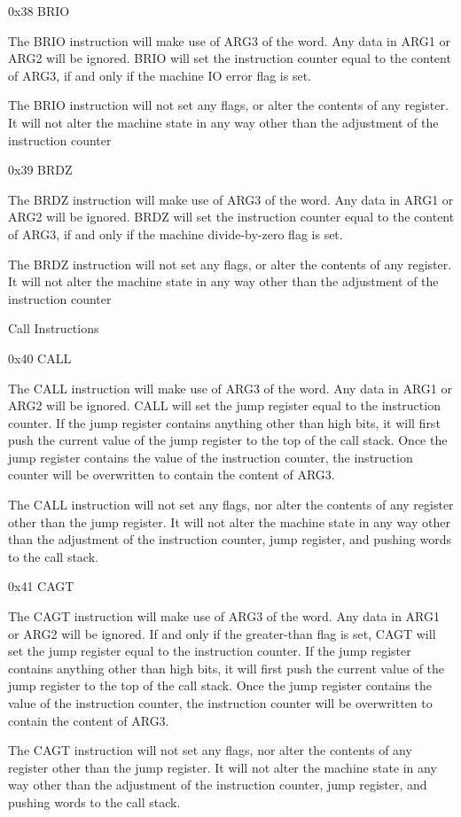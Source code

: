 \documentclass[]{article}
\begin{document}
0x38 BRIO

The BRIO instruction will make use of ARG3 of the word. Any data in ARG1
or ARG2 will be ignored. BRIO will set the instruction counter equal to
the content of ARG3, if and only if the machine IO error flag is set.~

The BRIO instruction will not set any flags, or alter the contents of
any register. It will not alter the machine state in any way other than
the adjustment of the instruction counter

0x39 BRDZ

The BRDZ instruction will make use of ARG3 of the word. Any data in ARG1
or ARG2 will be ignored. BRDZ will set the instruction counter equal to
the content of ARG3, if and only if the machine divide-by-zero flag is
set.~

The BRDZ instruction will not set any flags, or alter the contents of
any register. It will not alter the machine state in any way other than
the adjustment of the instruction counter

Call Instructions

0x40 CALL

The CALL instruction will make use of ARG3 of the word. Any data in ARG1
or ARG2 will be ignored. CALL will set the jump register equal to the
instruction counter. If the jump register contains anything other than
high bits, it will first push the current value of the jump register to
the top of the call stack. Once the jump register contains the value of
the instruction counter, the instruction counter will be overwritten to
contain the content of ARG3.

The CALL instruction will not set any flags, nor alter the contents of
any register other than the jump register. It will not alter the machine
state in any way other than the adjustment of the instruction counter,
jump register, and pushing words to the call stack.

0x41 CAGT

The CAGT instruction will make use of ARG3 of the word. Any data in ARG1
or ARG2 will be ignored. If and only if the greater-than flag is set,
CAGT will set the jump register equal to the instruction counter. If the
jump register contains anything other than high bits, it will first push
the current value of the jump register to the top of the call stack.
Once the jump register contains the value of the instruction counter,
the instruction counter will be overwritten to contain the content of
ARG3.

The CAGT instruction will not set any flags, nor alter the contents of
any register other than the jump register. It will not alter the machine
state in any way other than the adjustment of the instruction counter,
jump register, and pushing words to the call stack.
\end{document}

